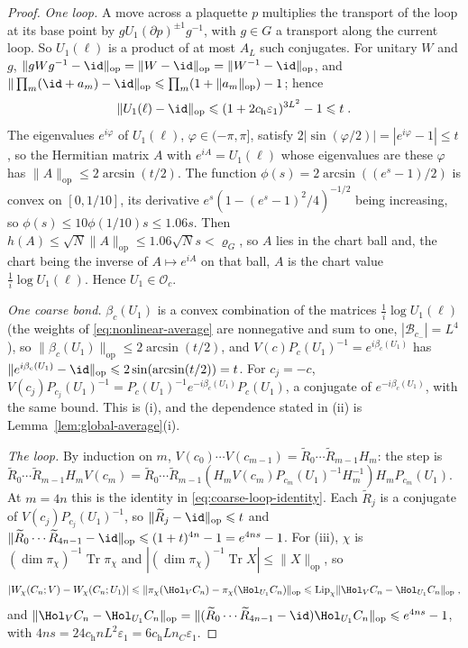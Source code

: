 \begin{proof}
\emph{One loop.} A move across a plaquette $p$ multiplies the transport of the loop at its base point by $gU_1(\partial p)^{\pm1}g^{-1}$, with $g\in G$ a transport along the current loop. So $U_1(\ell)$ is a product of at most $A_L$ such conjugates. For unitary $W$ and $g$, $\| gWg^{-1}-\id\|_{\mathrm{op}}=\| W-\id\|_{\mathrm{op}}=\| W^{-1}-\id\|_{\mathrm{op}}$, and $\|\prod_m(\id+a_m)-\id\|_{\mathrm{op}}\leqslant\prod_m(1+\| a_m\|_{\mathrm{op}})-1$; hence
\begin{equation*}
    \| U_1(\ell)-\id\|_{\mathrm{op}}\leqslant(1+2c_{\mathrm h}\varepsilon_1)^{3L^2}-1\leqslant t\;.
\end{equation*}
The eigenvalues $e^{i\varphi}$ of $U_1(\ell)$, $\varphi\in(-\pi,\pi]$, satisfy $2|\sin(\varphi/2)|=| e^{i\varphi}-1|\leqslant t$, so the Hermitian matrix $A$ with $e^{iA}= U_1(\ell)$ whose eigenvalues are these $\varphi$ has $\| A\|_{\mathrm{op}}\leqslant 2\arcsin(t/2)$. The function $\phi(s)= 2\arcsin((e^{s}-1)/2)$ is convex on $[0,1/10]$, its derivative $e^{s}(1-(e^{s}-1)^2/4)^{-1/2}$ being increasing, so $\phi(s)\leqslant 10\phi(1/10)s\leqslant 1.06s$. Then $h(A)\leqslant\sqrt N\| A\|_{\mathrm{op}}\leqslant 1.06\sqrt Ns<\varrho_G$, so $A$ lies in the chart ball and, the chart being the inverse of $A\mapsto e^{iA}$ on that ball, $A$ is the chart value $\frac1i\log U_1(\ell)$. Hence $U_1\in\mathcal O_c$.

\emph{One coarse bond.} $\beta_c(U_1)$ is a convex combination of the matrices $\frac1i\log U_1(\ell)$ (the weights of \eqref{eq:nonlinear-average} are nonnegative and sum to one, $|\mathcal B_{c_-}|= L^4$), so $\|\beta_c(U_1)\|_{\mathrm{op}}\leqslant 2\arcsin(t/2)$, and $V(c)P_c(U_1)^{-1}= e^{i\beta_c(U_1)}$ has $\| e^{i\beta_c(U_1)}-\id\|_{\mathrm{op}}\leqslant 2\sin(\arcsin(t/2))= t$. For $c_j=-c$, $V(c_j)P_{c_j}(U_1)^{-1}= P_c(U_1)^{-1}e^{-i\beta_c(U_1)}P_c(U_1)$, a conjugate of $e^{-i\beta_c(U_1)}$, with the same bound. This is (i), and the dependence stated in (ii) is Lemma~\ref{lem:global-average}(i).

\emph{The loop.} By induction on $m$, $V(c_0)\cdots V(c_{m-1})=\widetilde R_0\cdots\widetilde R_{m-1}H_m$: the step is $\widetilde R_0\cdots\widetilde R_{m-1}H_mV(c_m)=\widetilde R_0\cdots\widetilde R_{m-1}(H_mV(c_m)P_{c_m}(U_1)^{-1}H_m^{-1})H_mP_{c_m}(U_1)$. At $m= 4n$ this is the identity in \eqref{eq:coarse-loop-identity}. Each $\widetilde R_j$ is a conjugate of $V(c_j)P_{c_j}(U_1)^{-1}$, so $\|\widetilde R_j-\id\|_{\mathrm{op}}\leqslant t$ and $\|\widetilde R_0\cdots\widetilde R_{4n-1}-\id\|_{\mathrm{op}}\leqslant(1+t)^{4n}-1= e^{4ns}-1$. For (iii), $\chi$ is $(\dim\pi_{\chi})^{-1}\operatorname{Tr}\pi_{\chi}$ and $|(\dim\pi_{\chi})^{-1}\operatorname{Tr}X|\leqslant\| X\|_{\mathrm{op}}$, so
\begin{equation*}
    | W_{\chi}(C_n;V)-W_{\chi}(C_n;U_1)|\leqslant\|\pi_{\chi}(\Hol_VC_n)-\pi_{\chi}(\Hol_{U_1}C_n)\|_{\mathrm{op}}\leqslant\mathrm{Lip}_{\chi}\|\Hol_VC_n-\Hol_{U_1}C_n\|_{\mathrm{op}}\;,
\end{equation*}
and $\|\Hol_VC_n-\Hol_{U_1}C_n\|_{\mathrm{op}}=\|(\widetilde R_0\cdots\widetilde R_{4n-1}-\id)\Hol_{U_1}C_n\|_{\mathrm{op}}\leqslant e^{4ns}-1$, with $4ns= 24c_{\mathrm h}nL^2\varepsilon_1= 6c_{\mathrm h}Ln_C\varepsilon_1$.


\end{proof}
